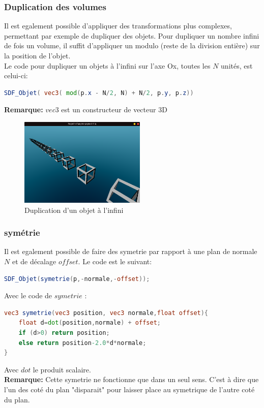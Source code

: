 \subsubsection{Duplication des volumes}
Il est egalement possible d'appliquer des transformations plus complexes, permettant par exemple de dupliquer des objets. Pour dupliquer un nombre infini de fois un volume, il suffit d'appliquer un modulo (reste de la division entière) sur la position de l'objet.
\\Le code pour dupliquer un objets à l'infini sur l'axe Ox, toutes les $N$ unités, est celui-ci:
\begin{lstlisting}[language=GLSL]
SDF_Objet( vec3( mod(p.x - N/2, N) + N/2, p.y, p.z))
\end{lstlisting}
\textbf{Remarque:} $vec3$ est un constructeur de vecteur 3D
\begin{figure}[h]
    \centering
    \includegraphics[width=6cm]{images/screens/infinite.png}
    \caption{Duplication d'un objet à l'infini}
    \label{fig:infinite}
\end{figure}

\subsubsection{symétrie}
Il est egalement possible de faire des symetrie par rapport à une plan de normale $N$ et de décalage $offset$. Le code est le suivant:
\begin{lstlisting}[language=GLSL]
SDF_Objet(symetrie(p,-normale,-offset));
\end{lstlisting}
Avec le code de $symetrie$ :
\begin{lstlisting}[language=GLSL]
vec3 symetrie(vec3 position, vec3 normale,float offset){
    float d=dot(position,normale) + offset;
    if (d>0) return position;
    else return position-2.0*d*normale;
}
\end{lstlisting}
Avec $dot$ le produit scalaire.
\\\textbf{Remarque:} Cette symetrie ne fonctionne que dans un seul sens. C'est à dire que l'un des coté du plan "disparait" pour laisser place au symetrique de l'autre coté du plan.